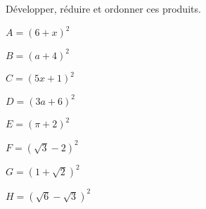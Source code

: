 
Développer, réduire et ordonner ces produits.

\begin{minipage}{4cm}
\begin{description}
\item $A=(6+x)^2$
\item $B=(a+4)^2$
\end{description}
\end{minipage}
\begin{minipage}{4cm}
\begin{description}
\item $C=(5x+1)^2$
\item $D=(3a+6)^2$
\end{description}
\end{minipage}
\begin{minipage}{4cm}
\begin{description}
\item $E=(\pi+2)^2$
\item $F=(\sqrt{3}-2)^2$
\end{description}
\end{minipage}
\begin{minipage}{4cm}
\begin{description}
\item $G=(1+\sqrt{2})^2$
\item $H=(\sqrt{6}-\sqrt{3})^2$
\end{description}
\end{minipage}